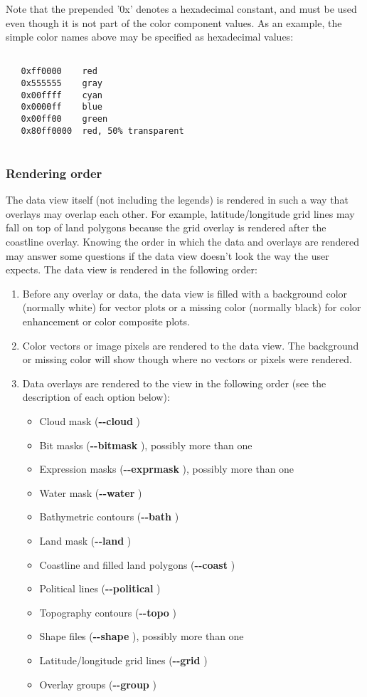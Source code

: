  Note that the prepended '0x' denotes a hexadecimal constant, and must be used even though it is not part of the color component values. As an example, the simple color names above may be specified as hexadecimal values:
\begin{verbatim}

   0xff0000    red
   0x555555    gray
   0x00ffff    cyan
   0x0000ff    blue
   0x00ff00    green
   0x80ff0000  red, 50% transparent
 
\end{verbatim}
\subsubsection*{Rendering order}


 The data view itself (not including the legends) is rendered in such a way that overlays may overlap each other. For example, latitude/longitude grid lines may fall on top of land polygons because the grid overlay is rendered after the coastline overlay. Knowing the order in which the data and overlays are rendered may answer some questions if the data view doesn't look the way the user expects. The data view is rendered in the following order:
\begin{enumerate}
\item Before any overlay or data, the data view is filled with a background color (normally white) for vector plots or a missing color (normally black) for color enhancement or color composite plots.
\item Color vectors or image pixels are rendered to the data view. The background or missing color will show though where no vectors or pixels were rendered.
\item Data overlays are rendered to the view in the following order (see the description of each option below): \begin{itemize}
\item Cloud mask (\textbf{-{-}cloud}
)
\item Bit masks (\textbf{-{-}bitmask}
), possibly more than one
\item Expression masks (\textbf{-{-}exprmask}
), possibly more than one
\item Water mask (\textbf{-{-}water}
)
\item Bathymetric contours (\textbf{-{-}bath}
)
\item Land mask (\textbf{-{-}land}
)
\item Coastline and filled land polygons (\textbf{-{-}coast}
)
\item Political lines (\textbf{-{-}political}
)
\item Topography contours (\textbf{-{-}topo}
)
\item Shape files (\textbf{-{-}shape}
), possibly more than one
\item Latitude/longitude grid lines (\textbf{-{-}grid}
)
\item Overlay groups (\textbf{-{-}group}
)

\end{itemize}


\end{enumerate}
